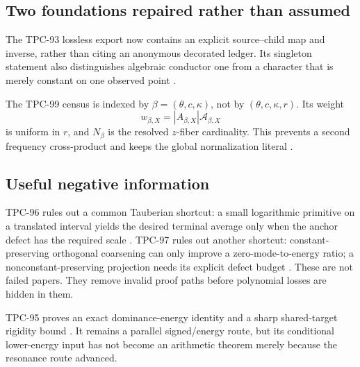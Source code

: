 \subsection{Two foundations repaired rather than assumed}

The TPC-93 lossless export now contains an explicit source--child
map and inverse, rather than citing an anonymous decorated ledger.
Its singleton statement also distinguishes algebraic conductor one
from a character that is merely constant on one observed point
\citep{WangTPC93}.

The TPC-99 census is indexed by
\(\beta=(\theta,c,\kappa)\), not by
\((\theta,c,\kappa,r)\).  Its weight
\[
 w_{\beta,X}
 =
 |A_{\beta,X}|\mathcal A_{\beta,X}
\]
is uniform in \(r\), and \(N_\beta\) is the resolved
\(z\)-fiber cardinality.  This prevents a second frequency
cross-product and keeps the global normalization literal
\citep{WangTPC94,WangTPC99}.

\subsection{Useful negative information}

TPC-96 rules out a common Tauberian shortcut: a small logarithmic
primitive on a translated interval yields the desired terminal
average only when the anchor defect has the required scale
\citep{WangTPC96}.  TPC-97 rules out another shortcut:
constant-preserving orthogonal coarsening can only improve a
zero-mode-to-energy ratio; a nonconstant-preserving projection
needs its explicit defect budget \citep{WangTPC97}.  These are not
failed papers.  They remove invalid proof paths before polynomial
losses are hidden in them.

\begin{remark}
TPC-95 proves an exact dominance-energy identity and a sharp
shared-target rigidity bound \citep{WangTPC95}.  It remains a
parallel signed/energy route, but its conditional lower-energy input
has not become an arithmetic theorem merely because the resonance
route advanced.
\end{remark}
